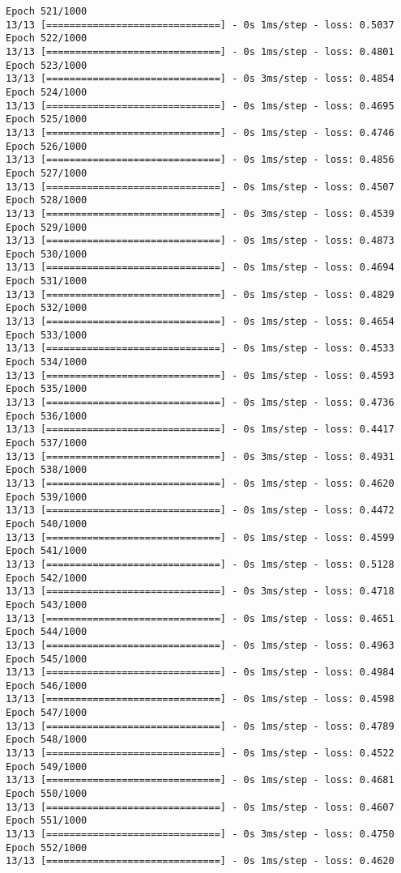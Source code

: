 \documentclass[11pt]{article}
\begin{document}
\begin{Verbatim}[commandchars=\\\{\}]
Epoch 521/1000
13/13 [==============================] - 0s 1ms/step - loss: 0.5037
Epoch 522/1000
13/13 [==============================] - 0s 1ms/step - loss: 0.4801
Epoch 523/1000
13/13 [==============================] - 0s 3ms/step - loss: 0.4854
Epoch 524/1000
13/13 [==============================] - 0s 1ms/step - loss: 0.4695
Epoch 525/1000
13/13 [==============================] - 0s 1ms/step - loss: 0.4746
Epoch 526/1000
13/13 [==============================] - 0s 1ms/step - loss: 0.4856
Epoch 527/1000
13/13 [==============================] - 0s 1ms/step - loss: 0.4507
Epoch 528/1000
13/13 [==============================] - 0s 3ms/step - loss: 0.4539
Epoch 529/1000
13/13 [==============================] - 0s 1ms/step - loss: 0.4873
Epoch 530/1000
13/13 [==============================] - 0s 1ms/step - loss: 0.4694
Epoch 531/1000
13/13 [==============================] - 0s 1ms/step - loss: 0.4829
Epoch 532/1000
13/13 [==============================] - 0s 1ms/step - loss: 0.4654
Epoch 533/1000
13/13 [==============================] - 0s 1ms/step - loss: 0.4533
Epoch 534/1000
13/13 [==============================] - 0s 1ms/step - loss: 0.4593
Epoch 535/1000
13/13 [==============================] - 0s 1ms/step - loss: 0.4736
Epoch 536/1000
13/13 [==============================] - 0s 1ms/step - loss: 0.4417
Epoch 537/1000
13/13 [==============================] - 0s 3ms/step - loss: 0.4931
Epoch 538/1000
13/13 [==============================] - 0s 1ms/step - loss: 0.4620
Epoch 539/1000
13/13 [==============================] - 0s 1ms/step - loss: 0.4472
Epoch 540/1000
13/13 [==============================] - 0s 1ms/step - loss: 0.4599
Epoch 541/1000
13/13 [==============================] - 0s 1ms/step - loss: 0.5128
Epoch 542/1000
13/13 [==============================] - 0s 3ms/step - loss: 0.4718
Epoch 543/1000
13/13 [==============================] - 0s 1ms/step - loss: 0.4651
Epoch 544/1000
13/13 [==============================] - 0s 1ms/step - loss: 0.4963
Epoch 545/1000
13/13 [==============================] - 0s 1ms/step - loss: 0.4984
Epoch 546/1000
13/13 [==============================] - 0s 1ms/step - loss: 0.4598
Epoch 547/1000
13/13 [==============================] - 0s 1ms/step - loss: 0.4789
Epoch 548/1000
13/13 [==============================] - 0s 1ms/step - loss: 0.4522
Epoch 549/1000
13/13 [==============================] - 0s 1ms/step - loss: 0.4681
Epoch 550/1000
13/13 [==============================] - 0s 1ms/step - loss: 0.4607
Epoch 551/1000
13/13 [==============================] - 0s 3ms/step - loss: 0.4750
Epoch 552/1000
13/13 [==============================] - 0s 1ms/step - loss: 0.4620

\end{Verbatim}
\end{document}

